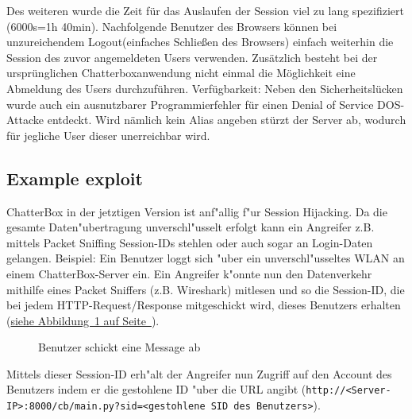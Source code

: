 \documentclass[12pt,a4paper,titlepage,oneside]{scrartcl}
\begin{document}
Des weiteren wurde die Zeit  für das Auslaufen der Session viel zu lang spezifiziert (6000s=1h 40min). Nachfolgende Benutzer des Browsers können bei unzureichendem Logout(einfaches Schließen des Browsers) einfach weiterhin die Session des zuvor angemeldeten Users verwenden. Zusätzlich besteht bei der ursprünglichen Chatterboxanwendung nicht einmal die Möglichkeit eine Abmeldung des Users durchzuführen.
\newline
\newline
Verfügbarkeit: Neben den Sicherheitslücken wurde auch ein ausnutzbarer Programmierfehler für einen Denial of Service DOS-Attacke entdeckt. Wird nämlich kein Alias angeben stürzt der Server ab, wodurch für jegliche User dieser unerreichbar wird.

\subsection{Example exploit}
ChatterBox in der jetztigen Version ist anf"allig f"ur Session Hijacking. Da die gesamte Daten"ubertragung unverschl"usselt erfolgt kann ein Angreifer z.B. mittels Packet Sniffing Session-IDs stehlen oder auch sogar an Login-Daten gelangen.
\newline
\newline
Beispiel:
\newline
Ein Benutzer loggt sich "uber ein unverschl"usseltes WLAN an einem ChatterBox-Server ein. Ein Angreifer k"onnte nun den Datenverkehr mithilfe eines Packet Sniffers (z.B. Wireshark) mitlesen und so die Session-ID, die bei jedem HTTP-Request/Response mitgeschickt wird, dieses Benutzers erhalten (\hyperref[fig:message]{siehe Abbildung~\ref*{fig:message} auf Seite~\pageref*{fig:message}}).
\begin{figure}[h!]
  \centering
  \caption{Benutzer schickt eine Message ab}
  \label{fig:message}
\end{figure}
\newline
\newline
Mittels dieser Session-ID erh"alt der Angreifer nun Zugriff auf den Account des Benutzers indem er die gestohlene ID "uber die URL angibt (\lstinline{http://<Server-IP>:8000/cb/main.py?sid=<gestohlene SID des Benutzers>}).
\end{document}
